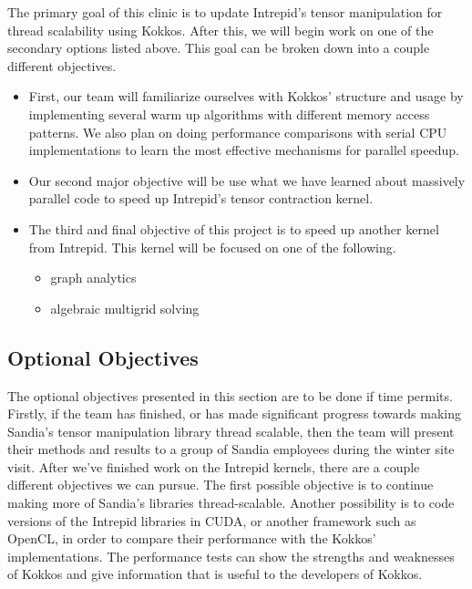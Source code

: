 \documentclass[proposal]{hmcclinic}
\begin{document}
The primary goal of this clinic is to update Intrepid's tensor
manipulation for thread scalability using Kokkos. After this, we will begin work
on one of the secondary options listed above. This goal can
be broken down into a couple different objectives.
\begin{itemize}
    \item First, our team will familiarize ourselves with Kokkos' structure and
        usage by implementing several warm up algorithms with different memory
        access patterns.  We also plan on doing performance comparisons with
        serial CPU implementations to learn the most effective mechanisms for
        parallel speedup.
    \item Our second major objective will be use what we have learned about
        massively parallel code to speed up Intrepid's tensor contraction
        kernel.
    \item The third and final objective of this project is to speed up another
        kernel from Intrepid.  This kernel will be focused on one of the
        following.
        \begin{itemize}
            \item graph analytics
            \item algebraic multigrid solving
        \end{itemize}
\end{itemize}

\subsection{Optional Objectives}

The optional objectives presented in this section are to be done if time
permits. Firstly, if the team has finished, or has made significant progress
towards making Sandia's tensor manipulation library thread scalable, then the
team will present their methods and results to a group of Sandia employees
during the winter site visit.  After we've finished work on the Intrepid
kernels, there are a couple different objectives we can pursue.  The first
possible objective is to continue making more of Sandia's libraries
thread-scalable. Another possibility is to code versions of the Intrepid
libraries in CUDA, or another framework such as OpenCL, in order to compare
their performance with the Kokkos' implementations. The performance tests can
show the strengths and weaknesses of Kokkos and give information that is useful
to the developers of Kokkos.
\end{document}
